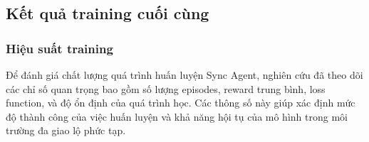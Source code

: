         

        
        
        

\subsection{Kết quả training cuối cùng}

\subsubsection{Hiệu suất training}
Để đánh giá chất lượng quá trình huấn luyện Sync Agent, nghiên cứu đã theo dõi các chỉ số quan trọng bao gồm số lượng episodes, reward trung bình, loss function, và độ ổn định của quá trình học. Các thông số này giúp xác định mức độ thành công của việc huấn luyện và khả năng hội tụ của mô hình trong môi trường đa giao lộ phức tạp.

